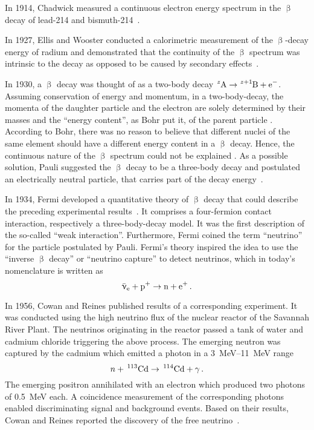 In 1914, Chadwick measured a continuous electron energy spectrum in the $\upbeta$ decay of lead-214 and bismuth-214~\cite{Chadwick:1}. 

In 1927, Ellis and Wooster conducted a calorimetric measurement of the $\upbeta$-decay energy of radium and demonstrated that the continuity of the $\upbeta$ spectrum was intrinsic to the decay as opposed to be caused by secondary effects~\cite{Ellis:1}. 

In 1930, a $\upbeta$ decay was thought of as a two-body decay $\ce{^zA} \rightarrow \ce{^{z+1}B} + \ce{e^-}$. Assuming conservation of energy and momentum, in a two-body-decay, the momenta of the daughter particle  and the electron  are solely determined by their masses and the ``energy content'', as Bohr put it, of the parent particle . According to Bohr, there was no reason to believe that different nuclei of the same element  should have a different energy content in a $\upbeta$ decay. Hence, the continuous nature of the $\upbeta$ spectrum could not be explained \cite{Bohr:1}. As a possible solution, Pauli suggested the $\upbeta$ decay to be a three-body decay and postulated an electrically neutral particle, that carries part of the decay energy~\cite{Pauli1930}. 

In 1934, Fermi developed a quantitative theory of $\upbeta$ decay that could describe the preceding experimental results~\cite{Fermi1934}. It comprises a four-fermion contact interaction, respectively a three-body-decay model. It was the first description of the so-called ``weak interaction''. Furthermore, Fermi coined the term ``neutrino'' for the particle postulated by Pauli. Fermi's theory inspired the idea to use the ``inverse $\upbeta$ decay'' or ``neutrino capture'' to detect neutrinos, which in today's nomenclature is written as
\begin{equation*}
    \aeneutrino + \ce{p^+} \rightarrow \ce{n} + \ce{e^+} \fullstop
\end{equation*}

In 1956, Cowan and Reines published results of a corresponding experiment. It was conducted using the high neutrino flux of the nuclear reactor of the Savannah River Plant. The neutrinos originating in the reactor passed a tank of water and cadmium chloride triggering the above process. The emerging neutron was captured by the cadmium which emitted a photon in a \SIrange{3}{11}{MeV} range
\begin{equation*}
	n+\,^{113}\mathrm{Cd}\rightarrow \,^{114}\mathrm{Cd}+\gamma
	\text{\,.}
\end{equation*}
The emerging positron annihilated with an electron which produced two photons of \SI{0.5}{MeV} each. A coincidence measurement of the corresponding photons enabled discriminating signal and background events. Based on their results, Cowan and Reines reported the discovery of the free neutrino~\cite{Cowan103}. 

